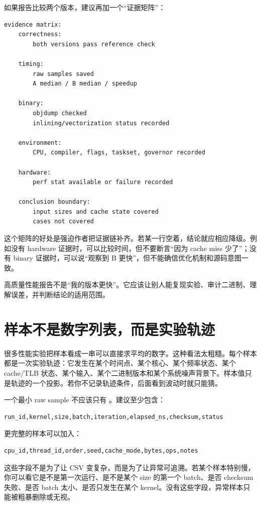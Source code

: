 如果报告比较两个版本，建议再加一个“证据矩阵”：

\begin{lstlisting}
evidence matrix:
    correctness:
        both versions pass reference check

    timing:
        raw samples saved
        A median / B median / speedup

    binary:
        objdump checked
        inlining/vectorization status recorded

    environment:
        CPU, compiler, flags, taskset, governor recorded

    hardware:
        perf stat available or failure recorded

    conclusion boundary:
        input sizes and cache state covered
        cases not covered
\end{lstlisting}

这个矩阵的好处是强迫作者把证据链补齐。若某一行空着，结论就应相应降级。例如没有 hardware 证据时，可以比较时间，但不要断言“因为 cache miss 少了”；没有 binary 证据时，可以说“观察到 B 更快”，但不能确信优化机制和源码意图一致。

\begin{keyidea}
高质量性能报告不是“我的版本更快”。它应该让别人能复现实验、审计二进制、理解误差，并判断结论的适用范围。
\end{keyidea}

\section{样本不是数字列表，而是实验轨迹}

很多性能实验把样本看成一串可以直接求平均的数字。这种看法太粗糙。每个样本都是一次实验轨迹：它发生在某个时间点、某个核心、某个频率状态、某个 cache/TLB 状态、某个输入、某个二进制版本和某个系统噪声背景下。样本值只是轨迹的一个投影。若你不记录轨迹条件，后面看到波动时就只能猜。

一个最小 raw sample 不应该只有 。建议至少包含：

\begin{lstlisting}
run_id,kernel,size,batch,iteration,elapsed_ns,checksum,status
\end{lstlisting}

更完整的样本可以加入：

\begin{lstlisting}
cpu_id,thread_id,order,seed,cache_mode,bytes,ops,notes
\end{lstlisting}

这些字段不是为了让 CSV 变复杂，而是为了让异常可追溯。若某个样本特别慢，你可以看它是不是第一次运行、是不是某个 size 的第一个 batch、是否 checksum 失败、是否 batch 太小、是否只发生在某个 kernel。没有这些字段，异常样本只能被粗暴删除或无视。


